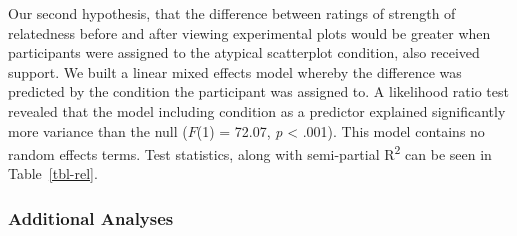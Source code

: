 \documentclass[manuscript,screen,review]{acmart}
\begin{document}
Our second hypothesis, that the difference between ratings of strength
of relatedness before and after viewing experimental plots would be
greater when participants were assigned to the atypical scatterplot
condition, also received support. We built a linear mixed effects model
whereby the difference was predicted by the condition the participant
was assigned to. A likelihood ratio test revealed that the model
including condition as a predictor explained significantly more variance
than the null (\(F\)(1) = 72.07, \emph{p} \textless{} .001). This model
contains no random effects terms. Test statistics, along with
semi-partial R\textsuperscript{2} can be seen in Table~\ref{tbl-rel}.

\begin{table}

\caption{\label{tbl-rel}Statistics for the significant main effect of
condition on the difference between pre and post scatterplot viewing
ratings for typical and atypical plots. Semi-partial
R\textsuperscript{2} is also incuded.}


\end{table}%

\subsubsection{Additional Analyses}\label{sec-add-analyses}

\begin{table}

\caption{\label{tbl-lit-stat}Statistics for main effects and
interactions when scores on the Subjective Graph Literacy test are
included in the model.}


\end{table}%
\end{document}
